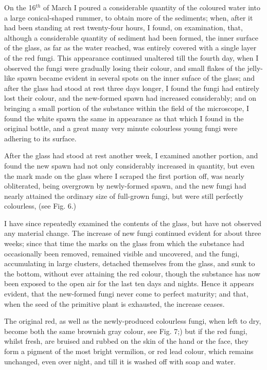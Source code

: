 \documentclass[a4paper, 12pt, oneside]{article}
\begin{document}
On the 16$^{th}$ of March I poured a considerable quantity of the coloured water into a large conical-shaped rummer, to obtain more of the sediments; when, after it had been standing at rest twenty-four hours, I found, on examination, that, although a considerable quantity of sediment had been formed, the inner surface of the glass, as far as the water reached, was entirely covered with a single layer of the red fungi. This appearance continued unaltered till the fourth day, when I observed the fungi were gradually losing their colour, and small flakes of the jelly-like spawn became evident in several spots on the inner suface of the glass; and after the glass had stood at rest three days longer, I found the fungi had entirely lost their colour, and the new-formed spawn had increased considerably; and on bringing a small portion of the substance within the field of the microscope, I found the white spawn the same in appearance as that which I found in the original bottle, and a great many very minute colourless young fungi were adhering to its surface.

After the glass had stood at rest another week, I examined another portion, and found the new spawn had not only considerably increased in quantity, but even the mark made on the glass where I scraped the first portion off, was nearly obliterated, being overgrown by newly-formed spawn, and the new fungi had nearly attained the ordinary size of full-grown fungi, but were still perfectly colourless, (see Fig. 6.)

I have since repeatedly examined the contents of the glass, but have not observed any material change. The increase of new fungi continued evident for about three weeks; since that time the marks on the glass from which the substance had occasionally been removed, remained visible and uncovered, and the fungi, accumulating in large clusters, detached themselves from the glass, and sunk to the bottom, without ever attaining the red colour, though the substance has now been exposed to the open air for the last ten days and nights. Hence it appears evident, that the new-formed fungi never come to perfect maturity; and that, when the seed of the primitive plant is exhausted, the increase ceases.

The original red, as well as the newly-produced colourless fungi, when left to dry, become both the same brownish gray colour, see Fig. 7;) but if the red fungi, whilst fresh, are bruised and rubbed on the skin of the hand or the face, they form a pigment of the most bright vermilion, or red lead colour, which remains unchanged, even over night, and till it is washed off with soap and water.
\end{document}
